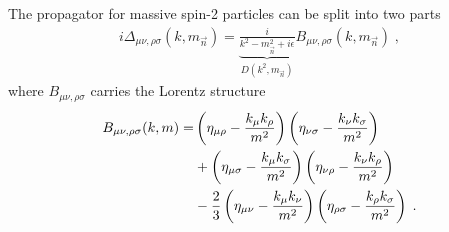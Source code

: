 The propagator for massive spin-2 particles can be split into two parts
\begin{align}
	i \Delta_{\mu\nu,\rho\sigma}(k,m_{\vec n}) =  \underbrace{\frac{i}{k^2-m_{\vec n}^2 + i\epsilon}}_{D(k^2,m_{\vec n})} B_{\mu\nu,\rho\sigma}(k,m_{\vec n})\;,
\end{align}
where $B_{\mu\nu,\rho\sigma}$ carries the Lorentz structure
\begin{align}
	B_{\mu\nu,\rho\sigma}(k,m) =&
	             \left(\eta_{\mu \rho} - \frac{k_\mu k_\rho}{m^2}\right) 
		     \left(\eta_{\nu \sigma} - \frac{k_\nu k_\sigma}{m^2}\right)\notag \\
         &  + \left(\eta_{\mu \sigma} - \frac{k_\mu k_\sigma}{m^2} \right)
		     \left(\eta_{\nu \rho} - \frac{k_\nu k_\rho}{m^2}\right) \notag \\
         &  - \frac23  
	   \left(\eta_{\mu \nu} - \frac{k_\mu k_\nu}{m^2}\right)
	   \left(\eta_{\rho \sigma} - \frac{k_\rho k_\sigma}{m^2}\right)\;.
\end{align}

